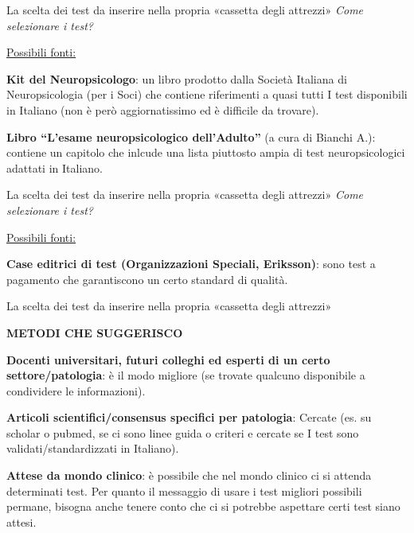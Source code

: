 \documentclass[
  ignorenonframetext,
]{beamer}
\begin{document}
\begin{frame}{\small La scelta dei test da inserire nella propria
«cassetta degli attrezzi»}
\label{la-scelta-dei-test-da-inserire-nella-propria-cassetta-degli-attrezzi-1}
\emph{Come selezionare i test?}

\underline{Possibili fonti:}

\textbf{Kit del Neuropsicologo}: un libro prodotto dalla Società
Italiana di Neuropsicologia (per i Soci) che contiene riferimenti a
quasi tutti I test disponibili in Italiano (non è però aggiornatissimo
ed è difficile da trovare).

\textbf{Libro ``L'esame neuropsicologico dell'Adulto''} (a cura di
Bianchi A.): contiene un capitolo che inlcude una lista piuttosto ampia
di test neuropsicologici adattati in Italiano.
\end{frame}

\begin{frame}{\small La scelta dei test da inserire nella propria
«cassetta degli attrezzi»}
\label{la-scelta-dei-test-da-inserire-nella-propria-cassetta-degli-attrezzi-2}
\emph{Come selezionare i test?}

\underline{Possibili fonti:}

\textbf{Case editrici di test (Organizzazioni Speciali, Eriksson)}: sono
test a pagamento che garantiscono un certo standard di qualità.
\end{frame}

\begin{frame}{\small La scelta dei test da inserire nella propria
«cassetta degli attrezzi»}
\label{la-scelta-dei-test-da-inserire-nella-propria-cassetta-degli-attrezzi-3}
\begin{center}
  \textbf{METODI CHE SUGGERISCO}
\end{center}

\textbf{Docenti universitari, futuri colleghi ed esperti di un certo
settore/patologia}: è il modo migliore (se trovate qualcuno disponibile
a condividere le informazioni).

\textbf{Articoli scientifici/consensus specifici per patologia}: Cercate
(es. su scholar o pubmed, se ci sono linee guida o criteri e cercate se
I test sono validati/standardizzati in Italiano).

\textbf{Attese da mondo clinico}: è possibile che nel mondo clinico ci
si attenda determinati test. Per quanto il messaggio di usare i test
migliori possibili permane, bisogna anche tenere conto che ci si
potrebbe aspettare certi test siano attesi.
\end{frame}
\end{document}
